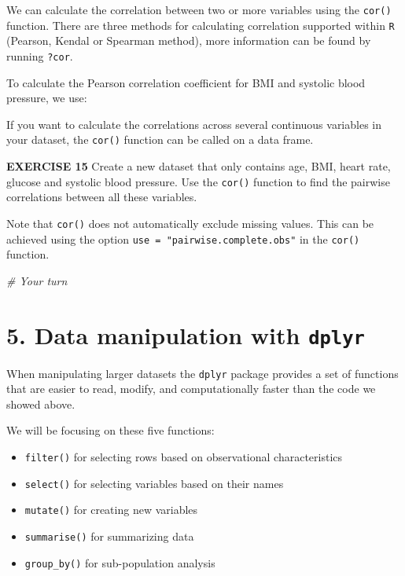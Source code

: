 \documentclass[
]{article}
\newenvironment{Shaded}{\begin{snugshade}}{\end{snugshade}}
\newcommand{\CommentTok}[1]{\textcolor[rgb]{0.56,0.35,0.01}{\textit{#1}}}
\newcommand{\FunctionTok}[1]{\textcolor[rgb]{0.00,0.00,0.00}{#1}}
\newcommand{\NormalTok}[1]{#1}
\newcommand{\SpecialCharTok}[1]{\textcolor[rgb]{0.00,0.00,0.00}{#1}}
\providecommand{\tightlist}{%
  \setlength{\itemsep}{0pt}\setlength{\parskip}{0pt}}
\begin{document}
We can calculate the correlation between two or more variables using the
\texttt{cor()} function. There are three methods for calculating
correlation supported within \texttt{R} (Pearson, Kendal or Spearman
method), more information can be found by running \texttt{?cor}.

To calculate the Pearson correlation coefficient for BMI and systolic
blood pressure, we use:

\begin{Shaded}
\end{Shaded}

If you want to calculate the correlations across several continuous
variables in your dataset, the \texttt{cor()} function can be called on
a data frame.

\textbf{EXERCISE 15} Create a new dataset that only contains age, BMI,
heart rate, glucose and systolic blood pressure. Use the \texttt{cor()}
function to find the pairwise correlations between all these variables.

Note that \texttt{cor()} does not automatically exclude missing values.
This can be achieved using the option
\texttt{use\ =\ "pairwise.complete.obs"} in the \texttt{cor()} function.

\begin{Shaded}
\begin{Highlighting}[]
\CommentTok{\# Your turn}
\end{Highlighting}
\end{Shaded}

\hypertarget{data-manipulation-with-dplyr}{%
\section{\texorpdfstring{5. Data manipulation with
\texttt{dplyr}}{5. Data manipulation with dplyr}}\label{data-manipulation-with-dplyr}}

When manipulating larger datasets the \texttt{dplyr} package provides a
set of functions that are easier to read, modify, and computationally
faster than the code we showed above.

We will be focusing on these five functions:

\begin{itemize}
\tightlist
\item
  \texttt{filter()} for selecting rows based on observational
  characteristics
\item
  \texttt{select()} for selecting variables based on their names
\item
  \texttt{mutate()} for creating new variables
\item
  \texttt{summarise()} for summarizing data
\item
  \texttt{group\_by()} for sub-population analysis
\end{itemize}
\end{document}
